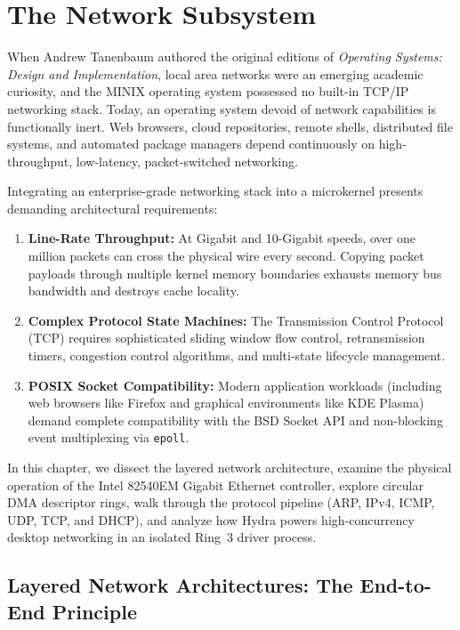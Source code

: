 \chapter{The Network Subsystem}
\label{chap:networking}

When Andrew Tanenbaum authored the original editions of \textit{Operating Systems: Design and Implementation}, local area networks were an emerging academic curiosity, and the MINIX operating system possessed no built-in TCP/IP networking stack. Today, an operating system devoid of network capabilities is functionally inert. Web browsers, cloud repositories, remote shells, distributed file systems, and automated package managers depend continuously on high-throughput, low-latency, packet-switched networking.

Integrating an enterprise-grade networking stack into a microkernel presents demanding architectural requirements:
\begin{enumerate}
    \item \textbf{Line-Rate Throughput:} At Gigabit and 10-Gigabit speeds, over one million packets can cross the physical wire every second. Copying packet payloads through multiple kernel memory boundaries exhausts memory bus bandwidth and destroys cache locality.
    \item \textbf{Complex Protocol State Machines:} The Transmission Control Protocol (TCP) requires sophisticated sliding window flow control, retransmission timers, congestion control algorithms, and multi-state lifecycle management.
    \item \textbf{POSIX Socket Compatibility:} Modern application workloads (including web browsers like Firefox and graphical environments like KDE Plasma) demand complete compatibility with the BSD Socket API and non-blocking event multiplexing via \texttt{epoll}.
\end{enumerate}

In this chapter, we dissect the layered network architecture, examine the physical operation of the Intel 82540EM Gigabit Ethernet controller, explore circular DMA descriptor rings, walk through the protocol pipeline (ARP, IPv4, ICMP, UDP, TCP, and DHCP), and analyze how Hydra powers high-concurrency desktop networking in an isolated Ring~3 driver process.

\section{Layered Network Architectures: The End-to-End Principle}
\label{sec:net_layers}

